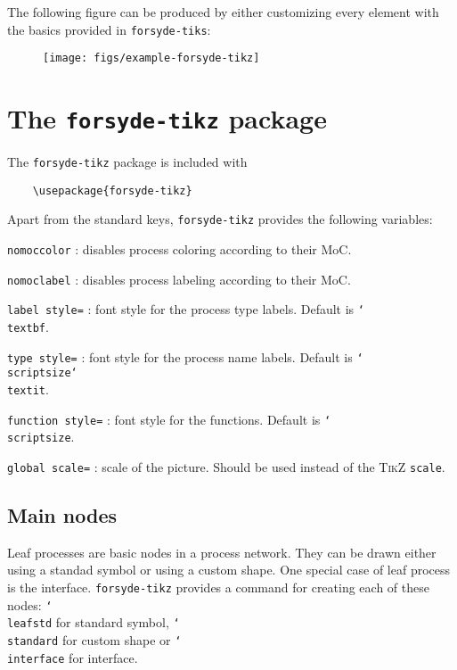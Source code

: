 \documentclass[10pt]{article}
\newenvironment{optionslist}[0]{ 
\begin{list}{}{
	\setlength{\itemindent}{-10pt}
	\setlength{\itemsep}{0pt}
	\setlength{\parsep}{0pt}
}}{\end{list}}
\newcommand\bookmark[1]{\marginpar{\ttfamily #1}}
\begin{document}
The following figure can be produced by either customizing every element with the basics provided in \texttt{forsyde-tiks}:

\begin{figure}[htb]\centering
\texttt{[image: figs/example-forsyde-tikz]}
\end{figure}



\section{The \texttt{forsyde-tikz} package}

The \texttt{forsyde-tikz} package is included with

\begin{verbatim}
	\usepackage{forsyde-tikz}
\end{verbatim}

Apart from the standard keys, \texttt{forsyde-tikz} provides the following variables:\bookmark{environment variables}
 \begin{optionslist}
\item \texttt{nomoccolor} : disables process coloring according to their MoC.
\item \texttt{nomoclabel} : disables process labeling according to their MoC.
\item \texttt{label style=} : font style for the process type labels. Default is \texttt{\char`\\ textbf}.
\item \texttt{type style=} : font style for the process name labels. Default is \texttt{\char`\\ scriptsize\char`\\textit}.
\item \texttt{function style=} : font style for the functions. Default is \texttt{\char`\\ scriptsize}.
\item \texttt{global scale=} : scale of the picture. Should be used instead of the \textsc{TikZ} \texttt{scale}.
\end{optionslist}

\subsection{Main nodes}

Leaf processes are basic nodes in a process network. They can be drawn either using a standad symbol or using a custom shape. One special case of leaf process is the interface. \texttt{forsyde-tikz} provides a command for creating each of these nodes: \texttt{\char`\\leafstd} for standard symbol, \texttt{\char`\\standard} for custom shape or \texttt{\char`\\interface} for interface.\\
\end{document}

